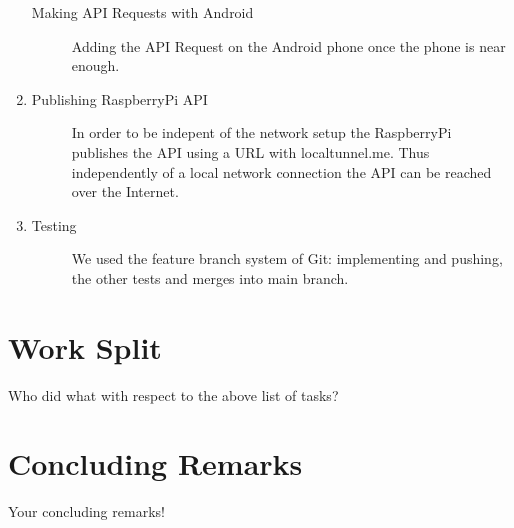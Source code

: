 \documentclass[
10pt, %
a4paper, %
oneside, %
headinclude,footinclude, %
BCOR5mm, %
]{scrartcl}
\begin{document}
\begin{enumerate}
\begin{description}
		\item[Making API Requests with Android] Adding the API Request on the Android phone once the phone is near enough.
	\end{description}
		\item 
		\begin{description}
		\item[Publishing RaspberryPi API] In order to be indepent of the network setup the RaspberryPi publishes the API using a URL with localtunnel.me. Thus independently of a local network connection the API can be reached over the Internet.
	\end{description}
	\item
	\begin{description}
		\item[Testing] We used the feature branch system of Git: implementing and pushing, the other tests and merges into main branch.
	\end{description}
\end{enumerate}

\section{Work Split}
Who did what with respect to the above list of tasks?

\section{Concluding Remarks}
Your concluding remarks!


\renewcommand{\refname}{\spacedlowsmallcaps{References}} %




\end{document}
